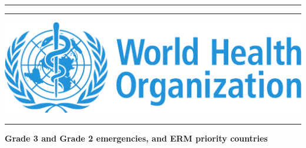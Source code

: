 \begin{titlepage}

\hspace*{-1cm}\begin{minipage}[t][0.1\textheight]{5cm}
\textcolor{whoblue!15}{\rule{5cm}{0.1\textheight}}
\end{minipage}
\hspace*{1cm}\begin{minipage}[t]{11.3cm}
\textcolor{whoblue}{\rule{11.3cm}{0.5mm}}
\end{minipage}

\newcommand*{\myfont}{\fontfamily{phv}\selectfont}

\hspace*{-1cm}\begin{minipage}[t][0.1\textheight]{5cm}
\vspace{0pt}
\includegraphics[height=0.1\textheight]{./figure/logo_who}\\[0.55cm]
\textcolor{whoblue!15}{\rule{5cm}{0.1\textheight}}
\end{minipage}
\hspace*{1cm}\begin{minipage}[t][0.2\textheight]{11.3cm}{}
\vspace{0pt}
\begin{flushright}
\begin{spacing}{2.0}
{\myfont \huge \textbf{Grade 3 and Grade 2 emergencies, and ERM priority countries}}
\end{spacing}
\end{flushright}
\end{minipage}


\end{titlepage}
